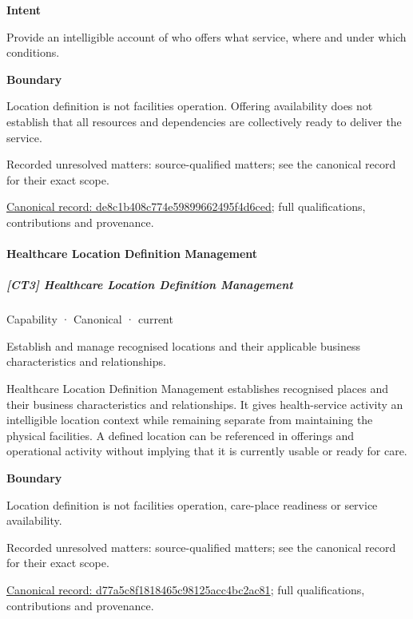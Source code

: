 \textbf{Intent}



Provide an intelligible account of who offers what service, where and under which conditions.



\textbf{Boundary}



Location definition is not facilities operation. Offering availability does not establish that all resources and dependencies are collectively ready to deliver the service.


{\small Recorded unresolved matters: source-qualified matters; see the canonical record for their exact scope.}\par
{\footnotesize \href{../../../../continuum/strategy/capability/de8c1b408c774e59899662495f4d6ced.md}{Canonical record: de8c1b408c774e59899662495f4d6ced}; full qualifications, contributions and provenance.}\par
\paragraph{Healthcare Location Definition Management}

\subparagraph{[CT3] Healthcare Location Definition Management}

\label{element:d77a5c8f1818465c98125acc4bc2ac81}
{\small Capability · Canonical · current}\par

Establish and manage recognised locations and their applicable business characteristics and relationships.



Healthcare Location Definition Management establishes recognised places and their business characteristics and relationships. It gives health-service activity an intelligible location context while remaining separate from maintaining the physical facilities. A defined location can be referenced in offerings and operational activity without implying that it is currently usable or ready for care.



\textbf{Boundary}



Location definition is not facilities operation, care-place readiness or service availability.


{\small Recorded unresolved matters: source-qualified matters; see the canonical record for their exact scope.}\par
{\footnotesize \href{../../../../continuum/strategy/capability/d77a5c8f1818465c98125acc4bc2ac81.md}{Canonical record: d77a5c8f1818465c98125acc4bc2ac81}; full qualifications, contributions and provenance.}\par

